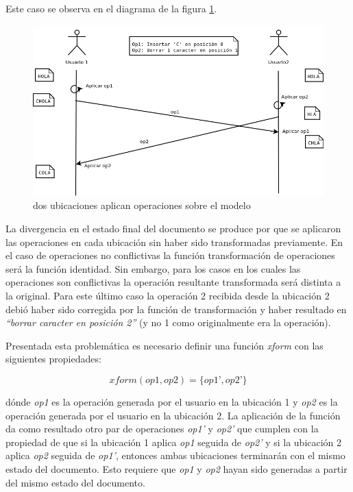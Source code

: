 \documentclass[12pt,a4paper]{article}
\begin{document}
	Este caso se observa en el diagrama de la figura \ref{secuencia_ops_2}.
	
	\begin{figure}[!ht]
		\begin{center}
			\includegraphics[width=14cm]{sincronizacion_fallida.png}
			\caption{\label{secuencia_ops_2} dos ubicaciones aplican operaciones sobre el modelo }
		\end{center}
	\end{figure}


	La divergencia en el estado final del documento se produce por que se aplicaron las operaciones en cada 
	ubicación sin haber sido transformadas previamente. En el caso de operaciones no conflictivas la función
	transformación de operaciones será la función  identidad. Sin embargo, para los casos en los cuales las
	operaciones son conflictivas la operación resultante transformada será distinta a la original.
	Para este último caso la operación 2 recibida desde la ubicación 2 debió haber sido corregida por la función
	de transformación y haber resultado en \textit{“borrar caracter en posición 2”} (y no 1 como originalmente
	era la operación).
	
	Presentada esta problemática es necesario definir una función \textit{xform} con las siguientes propiedades:
	
	\begin{equation} xform(op1,op2) = \lbrace op1’,op2’ \rbrace
	\end{equation}

	dónde \textit{op1} es la operación generada por el usuario en la ubicación 1 y \textit{op2} es la operación
	generada por el usuario en la ubicación 2. La aplicación de la función da como resultado otro par de operaciones
	\textit{op1’} y \textit{op2’} que cumplen con la propiedad de que si la ubicación 1 aplica \textit{op1} seguida
	de  \textit{op2’}  y si la ubicación 2 aplica \textit{op2} seguida de \textit{op1’}, entonces ambas
	ubicaciones terminarán con el mismo estado del documento.
	Esto requiere que \textit{op1} y \textit{op2} hayan sido generadas a partir del mismo estado del documento.
\end{document}
